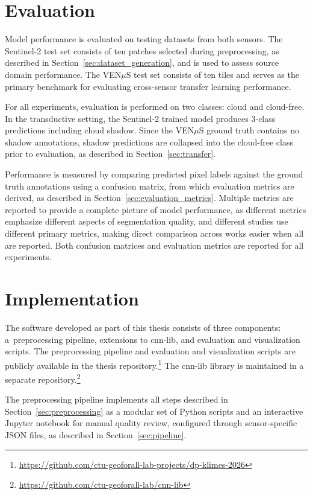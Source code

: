 \section{Evaluation}
\label{sec:evaluation}

Model performance is evaluated on testing datasets from both sensors. The Sentinel-2 test set consists of ten patches selected during preprocessing, as described in Section~\ref{sec:dataset_generation}, and is used to assess source domain performance. The VEN$\mu$S test set consists of ten tiles and serves as the primary benchmark for evaluating cross-sensor transfer learning performance.

For all experiments, evaluation is performed on two classes: cloud and cloud-free. In the transductive setting, the Sentinel-2 trained model produces 3-class predictions including cloud shadow. Since the VEN$\mu$S ground truth contains no shadow annotations, shadow predictions are collapsed into the cloud-free class prior to evaluation, as described in Section~\ref{sec:transfer}.

Performance is measured by comparing predicted pixel labels against the ground truth annotations using a confusion matrix, from which evaluation metrics are derived, as described in Section~\ref{sec:evaluation_metrics}. Multiple metrics are reported to provide a complete picture of model performance, as different metrics emphasize different aspects of segmentation quality, and different studies use different primary metrics, making direct comparison across works easier when all are reported. Both confusion matrices and evaluation metrics are reported for all experiments. 

\section{Implementation}
\label{sec:implementation}

The software developed as part of this thesis consists of three components: a~preprocessing pipeline, extensions to cnn-lib, and evaluation and visualization scripts. The preprocessing pipeline and evaluation and visualization scripts are publicly available in the thesis repository.\footnote{\url{https://github.com/ctu-geoforall-lab-projects/dp-klimes-2026}} The cnn-lib library is maintained in a separate repository.\footnote{\url{https://github.com/ctu-geoforall-lab/cnn-lib}}

The preprocessing pipeline implements all steps described in Section~\ref{sec:preprocessing} as a modular set of Python scripts and an interactive Jupyter notebook for manual quality review, configured through sensor-specific JSON files, as described in Section~\ref{sec:pipeline}.

